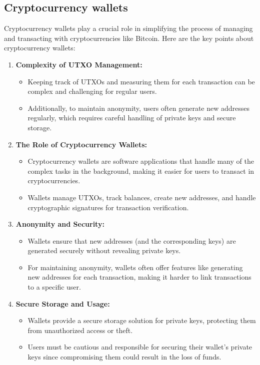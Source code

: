 \subsection{Cryptocurrency wallets}
    Cryptocurrency wallets play a crucial role in simplifying the process of managing and transacting with cryptocurrencies like Bitcoin. Here are the key points about cryptocurrency wallets:\\
\begin{enumerate}
    \item \textbf{Complexity of UTXO Management:} 
    \begin{itemize}
        \item Keeping track of UTXOs and measuring them for each transaction can be complex and challenging for regular users.
        \item Additionally, to maintain anonymity, users often generate new addresses regularly, which requires careful handling of private keys and secure storage.
    \end{itemize}
    \item \textbf{The Role of Cryptocurrency Wallets:} 
    \begin{itemize}
        \item Cryptocurrency wallets are software applications that handle many of the complex tasks in the background, making it easier for users to transact in cryptocurrencies.
        \item Wallets manage UTXOs, track balances, create new addresses, and handle cryptographic signatures for transaction verification.
    \end{itemize}
    \item \textbf{Anonymity and Security:}
    \begin{itemize}
        \item Wallets ensure that new addresses (and the corresponding keys) are generated securely without revealing private keys.
        \item For maintaining anonymity, wallets often offer features like generating new addresses for each transaction, making it harder to link transactions to a specific user.
    \end{itemize}
    \item \textbf{Secure Storage and Usage:}
    \begin{itemize}
        \item Wallets provide a secure storage solution for private keys, protecting them from unauthorized access or theft.
        \item Users must be cautious and responsible for securing their wallet's private keys since compromising them could result in the loss of funds.

\end{itemize}
\end{enumerate}
